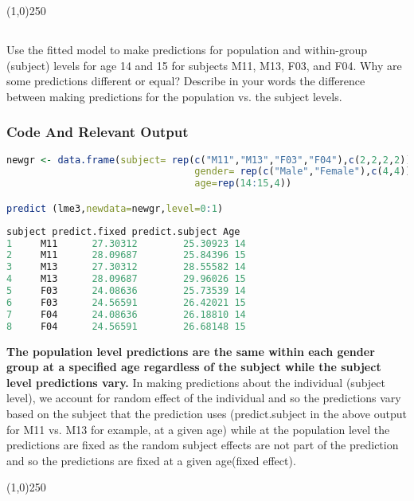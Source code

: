 \documentclass[a4paper]{article}
\begin{document}
\begin{center}
\line(1,0){250}
\end{center}
\pagebreak


\subsection{}Use the fitted model to make predictions for population and within-group (subject) levels for age 14 and 15 for subjects M11, M13, F03, and F04. Why are some predictions different or equal? Describe in your words the difference between making predictions for the population vs. the subject levels.

\subsubsection{Code And Relevant Output}
\begin{lstlisting}[language=R]
newgr <- data.frame(subject= rep(c("M11","M13","F03","F04"),c(2,2,2,2)),
                                 gender= rep(c("Male","Female"),c(4,4)),
                                 age=rep(14:15,4))

predict (lme3,newdata=newgr,level=0:1) 
\end{lstlisting}
\begin{lstlisting}[language=R,frame=none]
  subject predict.fixed predict.subject Age
1     M11      27.30312        25.30923 14
2     M11      28.09687        25.84396	15
3     M13      27.30312        28.55582	14
4     M13      28.09687        29.96026	15
5     F03      24.08636        25.73539	14
6     F03      24.56591        26.42021	15
7     F04      24.08636        26.18810	14
8     F04      24.56591        26.68148	15
\end{lstlisting}
\textbf{The population level predictions are the same within each gender group at a specified age regardless of the subject while the subject level predictions vary.} In making predictions about the individual (subject level), we account for random effect of the individual and so the predictions vary based on the subject that the prediction uses (predict.subject in the above output for M11 vs. M13 for example, at a given age) while at the population level the predictions are fixed as the random subject effects are not part of the prediction and so the predictions are fixed at a given age(fixed effect).
\begin{center}
\line(1,0){250}
\end{center}
\pagebreak
\end{document}
